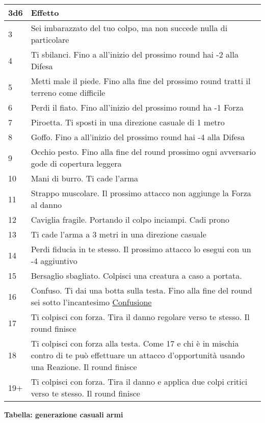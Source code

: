 {{\begin{multicols}{2}
\noindent\begin{tabularx}{\linewidth}{l|X}
	\toprule
\textbf{3d6} & \textbf{Effetto}\\
\toprule
3& Sei imbarazzato del tuo colpo, ma non succede nulla di particolare\\
4& Ti sbilanci. Fino a all'inizio del prossimo round hai -2 alla Difesa\\
5& Metti male il piede. Fino alla fine del prossimo round tratti il terreno come difficile\\
6& Perdi il fiato. Fino all'inizio del prossimo round ha -1 Forza\\
7& Piroetta. Ti sposti in una direzione casuale di 1 metro\\
8& Goffo. Fino a all'inizio del prossimo round hai -4 alla Difesa\\
9& Occhio pesto. Fino alla fine del round prossimo ogni avversario gode di copertura leggera\\
10 & Mani di burro. Ti cade l'arma\\
11 & Strappo muscolare. Il prossimo attacco non aggiunge la Forza al danno\\
12 & Caviglia fragile. Portando il colpo inciampi. Cadi prono\\
13 & Ti cade l'arma a 3 metri in una direzione casuale\\
14 & Perdi fiducia in te stesso. Il prossimo attacco lo esegui con un -4 aggiuntivo\\
15 & Bersaglio sbagliato. Colpisci una creatura a caso a portata.\\
16 & Confuso. Ti dai una botta sulla testa. Fino alla fine del round sei sotto l'incantesimo \hyperlink{Confusione}{Confusione}\\
17 & Ti colpisci con forza. Tira il danno regolare verso te stesso. Il round finisce\\
18 & Ti colpisci con forza alla testa. Come 17 e chi è in mischia contro di te può effettuare un attacco d'opportunità usando una Reazione. Il round finisce\\
19+& Ti colpisci con forza. Tira il danno e applica due colpi critici verso te stesso. Il round finisce
\end{tabularx}

\medskip

\end{multicols}

\textbf{Tabella: generazione casuali armi}

\medskip

}}
